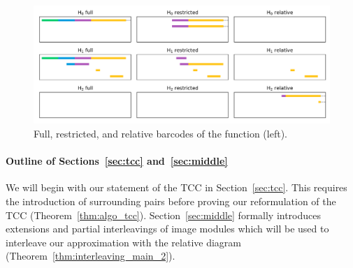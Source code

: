 \begin{figure}[htbp]
\begin{minipage}[b]{0.7\textwidth}
    \includegraphics[width=\textwidth]{scripts/figures/barcodes/res_rel.png}
  \end{minipage}
  \caption{Full, restricted, and relative barcodes of the function (left).}%
\end{figure}

\paragraph*{Outline of Sections~\ref{sec:tcc} and~\ref{sec:middle}}

We will begin with our statement of the TCC in Section~\ref{sec:tcc}.
This requires the introduction of surrounding pairs before proving our reformulation of the TCC (Theorem~\ref{thm:algo_tcc}).
Section~\ref{sec:middle} formally introduces extensions and partial interleavings of image modules which will be used to interleave our approximation with the relative diagram (Theorem~\ref{thm:interleaving_main_2}).


